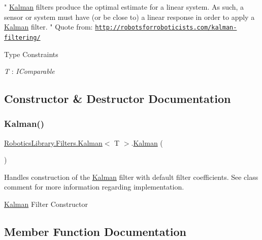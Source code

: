 " \hyperlink{class_robotics_library_1_1_filters_1_1_kalman}{Kalman} filters produce the optimal estimate for a linear system. As such, a sensor or system must have (or be close to) a linear response in order to apply a \hyperlink{class_robotics_library_1_1_filters_1_1_kalman}{Kalman} filter. " Quote from\+: \href{http://robotsforroboticists.com/kalman-filtering/}{\tt http\+://robotsforroboticists.\+com/kalman-\/filtering/} \begin{Desc}
\item[Type Constraints]\begin{description}
\item[{\em T} : {\em I\+Comparable}]\end{description}
\end{Desc}


\subsection{Constructor \& Destructor Documentation}
\mbox{\label{class_robotics_library_1_1_filters_1_1_kalman_a4c97ac8d96d0ce247be5331d549ff8df}} 
\subsubsection{\texorpdfstring{Kalman()}{Kalman()}}
{\footnotesize\ttfamily \hyperlink{class_robotics_library_1_1_filters_1_1_kalman}{Robotics\+Library.\+Filters.\+Kalman}$<$ T $>$.\hyperlink{class_robotics_library_1_1_filters_1_1_kalman}{Kalman} (\begin{DoxyParamCaption}{ }\end{DoxyParamCaption})}



Handles construction of the \hyperlink{class_robotics_library_1_1_filters_1_1_kalman}{Kalman} filter with default filter coefficients. See class comment for more information regarding implementation.

\hyperlink{class_robotics_library_1_1_filters_1_1_kalman}{Kalman} Filter Constructor 

\subsection{Member Function Documentation}
\mbox{\label{class_robotics_library_1_1_filters_1_1_kalman_a92a029a73d197e692fc35b1f6e0ba238}} 
